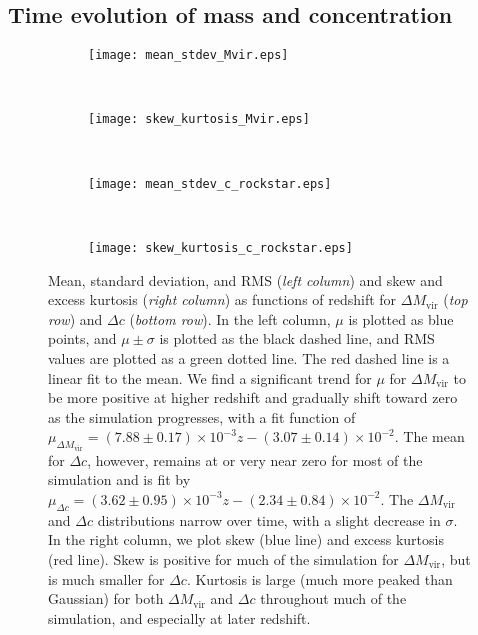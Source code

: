 \subsection{Time evolution of mass and concentration}


\begin{figure*}[t]
	\centering
	\begin{subfigure}{}
		\texttt{[image: mean\_stdev\_Mvir.eps]}
	\end{subfigure}
	~
	\begin{subfigure}{}
		\texttt{[image: skew\_kurtosis\_Mvir.eps]}
	\end{subfigure}
	\\
	\begin{subfigure}{}
		\texttt{[image: mean\_stdev\_c\_rockstar.eps]}
	\end{subfigure}
	~
	\begin{subfigure}{}
		\texttt{[image: skew\_kurtosis\_c\_rockstar.eps]}
	\end{subfigure}
	\caption[Statistics as functions of redshift for generalized normal fits]{\footnotesize Mean, standard deviation, and RMS (\textit{left column}) and skew and excess kurtosis (\textit{right column}) as functions of redshift for $\Delta M_{\mathrm{vir}}$ (\textit{top row}) and $\Delta c$ (\textit{bottom row}).  In the left column, $\mu$ is plotted as blue points, and $\mu \pm \sigma$ is plotted as the black dashed line, and RMS values are plotted as a green dotted line.  The red dashed line is a linear fit to the mean.  We find a significant trend for $\mu$ for $\Delta M_{\mathrm{vir}}$ to be more positive at higher redshift and gradually shift toward zero as the simulation progresses, with a fit function of $\mu_{\Delta M_{\mathrm{vir}}} = (7.88 \pm 0.17) \times 10^{-3} z - (3.07 \pm 0.14) \times 10^{-2}$.  The mean for $\Delta c$, however, remains at or very near zero for most of the simulation and is fit by $\mu_{\Delta c} = (3.62 \pm 0.95) \times 10^{-3} z - (2.34 \pm 0.84) \times 10^{-2}$.  The $\Delta M_{\mathrm{vir}}$ and $\Delta c$ distributions narrow over time, with a slight decrease in $\sigma$.  In the right column, we plot skew (blue line) and excess kurtosis (red line).  Skew is positive for much of the simulation for $\Delta M_{\mathrm{vir}}$, but is much smaller for $\Delta c$.  Kurtosis is large (much more peaked than Gaussian) for both $\Delta M_{\mathrm{vir}}$ and $\Delta c$ throughout much of the simulation, and especially at later redshift.}
	\label{fig:fit_trends}
\end{figure*}

